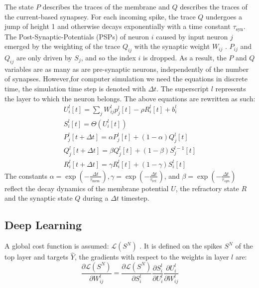 \documentclass[12pt]{report}
\begin{document}
The state $P$ describes the traces of the membrane and $Q$ describes the traces of the current-based synapsey. For each incoming spike, the trace $Q$ undergoes a jump of height 1 and otherwise decays exponentially with a time constant $\tau_{\mathrm{syn}}$. The Post-Synaptic-Potentials (PSPs) of neuron $i$ caused by input neuron $j$ emerged by the weighting of the trace $Q_{i j}$ with the synaptic weight $W_{i j}$ . $P_{i j}$ and $Q_{i j}$ are only driven by $S_{j}$, and so the index $i$ is dropped. As a result, the $P$ and $Q$ variables are as many as are pre-synaptic neurons, independently of the number of synapses. 
However,for computer simulation we need the equations in discrete time, the simulation time step is denoted with $\Delta t$. The superscript $l$ represents the layer to which the neuron belongs. The above equations are rewritten as such:
\begin{equation}
\begin{aligned}
U_{i}^{l}[t]=\sum_{j} W_{i j}^{l} p_{j}^{l}[t]-\rho R_{i}^{l}[t]+b_{i}^{l} \\
S_{i}^{l}[t]=\Theta\left(U_{i}^{l}[t]\right) \\
P_{j}^{l}[t+\Delta t]=\alpha P_{j}^{l}[t]+(1-\alpha) Q_{j}^{l}[t] \\
Q_{j}^{l}[t+\Delta t]=\beta Q_{j}^{l}[t]+(1-\beta) S_{j}^{l-1}[t] \\
R_{i}^{l}[t+\Delta t]=\gamma R_{i}^{l}[t]+(1-\gamma) S_{i}^{l}[t]
\end{aligned}
\end{equation}
The constants $\alpha=\exp \left(-\frac{\Delta t}{\tau_{\text {mem }}}\right), \gamma=\exp \left(-\frac{\Delta t}{\tau_{\text {ref }}}\right)$, and $\beta=\exp \left(-\frac{\Delta t}{\tau_{s y n}}\right)$ reflect the decay dynamics of the membrane potential $U$, the refractory state $R$ and the synaptic state $Q$ during a $\Delta t$ timestep.
\subsection{Deep Learning}
A global cost function is assumed: $\mathcal{L}\left(S^{N}\right)$ . It is defined on the spikes $S^{N}$ of the top layer and targets $\hat{Y}$, the gradients with respect to the weights in layer $l$ are:
\begin{equation}
\frac{\partial \mathcal{L}\left(S^{N}\right)}{\partial W_{i j}^{l}}=\frac{\partial \mathcal{L}\left(S^{N}\right)}{\partial S_{i}^{l}} \frac{\partial S_{i}^{l}}{\partial U_{i}^{l}} \frac{\partial U_{i}^{l}}{\partial W_{i j}^{l}}
\end{equation}
\end{document}
